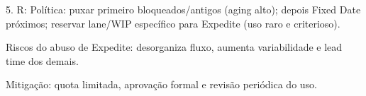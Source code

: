 \documentclass[12pt,a4paper]{article}
\begin{document}
5. R: Política: puxar primeiro bloqueados/antigos (aging alto); depois Fixed Date próximos;
reservar lane/WIP específico para Expedite (uso raro e criterioso).

Riscos do abuso de Expedite: desorganiza fluxo, aumenta variabilidade e lead time dos
demais.

Mitigação: quota limitada, aprovação formal e revisão periódica do uso.
\end{document}
